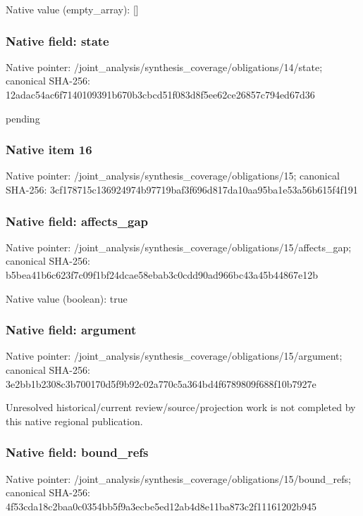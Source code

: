 \documentclass[10pt,a4paper]{article}
\begin{document}
Native value (empty\_\allowbreak{}array): []

\subsubsection{Native field: state}
Native pointer: /joint\_\allowbreak{}analysis/synthesis\_\allowbreak{}coverage/obligations/14/state; canonical SHA-256: 12adac54ac6f7140109391b670b3cbcd51f083d8f5ee62ce26857c794ed67d36

\begingroup\raggedright\sloppy pending\par\endgroup

\subsubsection{Native item 16}
Native pointer: /joint\_\allowbreak{}analysis/synthesis\_\allowbreak{}coverage/obligations/15; canonical SHA-256: 3cf178715c136924974b97719baf3f696d817da10aa95ba1e53a56b615f4f191

\subsubsection{Native field: affects\_\allowbreak{}gap}
Native pointer: /joint\_\allowbreak{}analysis/synthesis\_\allowbreak{}coverage/obligations/15/affects\_\allowbreak{}gap; canonical SHA-256: b5bea41b6c623f7c09f1bf24dcae58ebab3c0cdd90ad966bc43a45b44867e12b

Native value (boolean): true

\subsubsection{Native field: argument}
Native pointer: /joint\_\allowbreak{}analysis/synthesis\_\allowbreak{}coverage/obligations/15/argument; canonical SHA-256: 3e2bb1b2308c3b700170d5f9b92c02a770c5a364bd4f6789809f688f10b7927e

\begingroup\raggedright\sloppy Unresolved historical/\allowbreak{}current review/\allowbreak{}source/\allowbreak{}projection work is not completed by this native regional publication.\par\endgroup

\subsubsection{Native field: bound\_\allowbreak{}refs}
Native pointer: /joint\_\allowbreak{}analysis/synthesis\_\allowbreak{}coverage/obligations/15/bound\_\allowbreak{}refs; canonical SHA-256: 4f53cda18c2baa0c0354bb5f9a3ecbe5ed12ab4d8e11ba873c2f11161202b945
\end{document}
